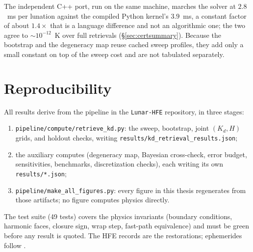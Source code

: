\documentclass[11pt,a4paper,oneside]{report}
\newcommand{\Kd}{\ensuremath{K_d}}
\begin{document}
The independent C++ port, run on the same machine, marches the solver
at $2.8$~ms per lunation against the compiled Python kernel's
$3.9$~ms, a constant factor of about $1.4\times$ that is a language
difference and not an algorithmic one; the two agree to
${\sim}10^{-12}$~K over full retrievals
(\S\ref{sec:certsummary}). Because the bootstrap and the degeneracy
map reuse cached sweep profiles, they add only a small constant on top
of the sweep cost and are not tabulated separately.

\chapter{Reproducibility}\label{app:repro}
All results derive from the pipeline in the \texttt{Lunar-HFE}
repository, in three stages:
\begin{enumerate}
  \item \texttt{pipeline/compute/retrieve\_kd.py}: the sweep,
    bootstrap, joint $(\Kd,H)$ grids, and holdout checks, writing
    \texttt{results/kd\_retrieval\_results.json};
  \item the auxiliary computes (degeneracy map, Bayesian cross-check,
    error budget, sensitivities, benchmarks, discretization checks),
    each writing its own \texttt{results/*.json};
  \item \texttt{pipeline/make\_all\_figures.py}: every figure in this
    thesis regenerates from those artifacts; no figure computes
    physics directly.
\end{enumerate}
The test suite (49 tests) covers the physics invariants (boundary
conditions, harmonic faces, closure sign, wrap step, fast-path
equivalence) and must be green before any result is quoted. The HFE
records are the \citet{nagihara2018} restorations; ephemerides follow
\citet{acton1996,acton2018,mazarico2011}.
\end{document}
